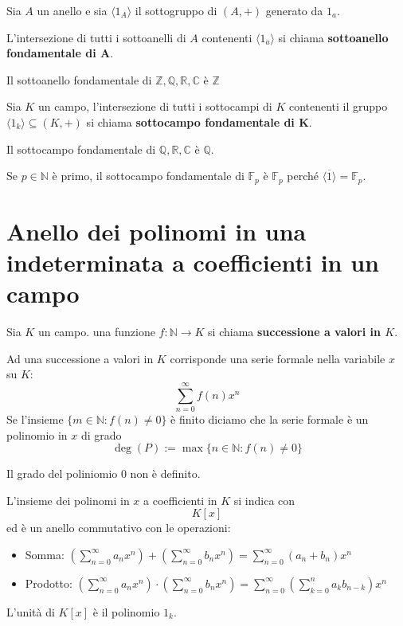 \documentclass[../main.tex]{subfiles}
\begin{document}
\begin{definition}
    Sia $A$ un anello e sia $\langle1_A\rangle$ il sottogruppo di $(A,+)$ generato da $1_a$.

    L'intersezione di tutti i sottoanelli di $A$ contenenti $\langle 1_a\rangle$ si chiama \textbf{sottoanello fondamentale di A}.
\end{definition}

\begin{example}
    Il sottoanello fondamentale di $\mathbb{Z},\mathbb{Q},\mathbb{R},\mathbb{C}$ è $\mathbb{Z}$
\end{example}

\begin{definition}
    Sia $K$ un campo, l'intersezione di tutti i sottocampi di $K$ contenenti il gruppo $\langle1_k\rangle \subseteq (K,+)$ si chiama \textbf{sottocampo fondamentale di K}.
\end{definition}

\begin{example}
    Il sottocampo fondamentale di $\mathbb{Q},\mathbb{R},\mathbb{C}$ è $\mathbb{Q}$.

    Se $p \in \mathbb{N}$ è primo, il sottocampo fondamentale di $\mathbb{F}_p$ è $\mathbb{F}_p$ perché $\langle\overline{1}\rangle = \mathbb{F}_p$.
\end{example}

\section{Anello dei polinomi in una indeterminata a coefficienti in un campo}
\begin{definition}
    Sia $K$ un campo. una funzione $f: \mathbb{N} \rightarrow K$ si chiama \textbf{successione a valori in $K$}.
\end{definition}
Ad una successione a valori in $K$ corrisponde una serie formale nella variabile $x$ su $K$:
\begin{equation*}
    \sum_{n=0}^{\infty} f(n) x^n
\end{equation*}
Se l'insieme $\{ m \in \mathbb{N} : f(n) \neq 0\}$ è finito diciamo che la serie formale è un polinomio in $x$ di grado
\[
    \boxed{
        \deg(P) := \max \{ n \in \mathbb{N}: f(n) \neq 0\}
    }
\]
\begin{note}
    Il grado del poliniomio $0$ non è definito.
\end{note}
L'insieme dei polinomi in $x$ a coefficienti in $K$ si indica con
\[
    \boxed{K[x]}
\]
ed è un anello commutativo con le operazioni:
\begin{itemize}
    \item Somma: $(\sum_{n=0}^{\infty} a_n x^n) + (\sum_{n=0}^{\infty} b_n x^n) = \sum_{n=0}^{\infty} (a_n + b_n) x^n$
    \item Prodotto: $(\sum_{n=0}^{\infty} a_n x^n) \cdot (\sum_{n=0}^{\infty} b_n x^n) = \sum_{n=0}^{\infty} (\sum_{k=0}^{n} a_k b_{n-k}) x^n$
\end{itemize}
L'unità di $K[x]$ è il polinomio $1_k$.
\end{document}
